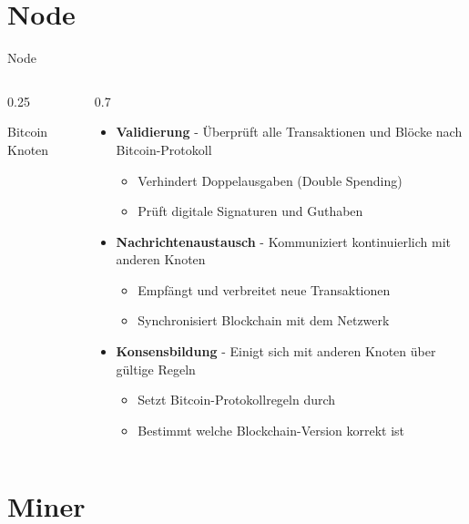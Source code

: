 \documentclass[aspectratio=169,t,11pt]{beamer}
\begin{document}
\section{Node}

\begin{frame}{Node}
	\begin{columns}[T]
		\begin{column}{0.25\textwidth}
			\centering
			\vspace{0.3cm}

			{\small Bitcoin Knoten}
		\end{column}

		\begin{column}{0.7\textwidth}
			\begin{itemize}
				\item \textbf{Validierung} - Überprüft alle Transaktionen und Blöcke nach Bitcoin-Protokoll
				      \begin{itemize}
					      \item Verhindert Doppelausgaben (Double Spending)
					      \item Prüft digitale Signaturen und Guthaben
				      \end{itemize}
				\item \textbf{Nachrichtenaustausch} - Kommuniziert kontinuierlich mit anderen Knoten
				      \begin{itemize}
					      \item Empfängt und verbreitet neue Transaktionen
					      \item Synchronisiert Blockchain mit dem Netzwerk
				      \end{itemize}
				\item \textbf{Konsensbildung} - Einigt sich mit anderen Knoten über gültige Regeln
				      \begin{itemize}
					      \item Setzt Bitcoin-Protokollregeln durch
					      \item Bestimmt welche Blockchain-Version korrekt ist
				      \end{itemize}
			\end{itemize}
		\end{column}
	\end{columns}
\end{frame}

\section{Miner}
\end{document}

